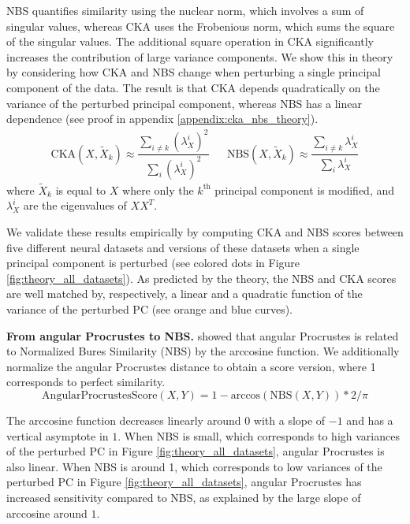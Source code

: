 \documentclass{article} %
\begin{document}
NBS quantifies similarity using the nuclear norm, which involves a sum of singular values, whereas CKA uses the Frobenious norm, which sums the square of the singular values. The additional square operation in CKA significantly increases the contribution of large variance components. We show this in theory by considering how CKA and NBS change when perturbing a single principal component of the data. The result is that CKA depends quadratically on the variance of the perturbed principal component, whereas NBS has a linear dependence (see proof in appendix \ref{appendix:cka_nbs_theory}).
\begin{align*}
\text{CKA}(X, \tilde{X}_k) \approx \dfrac{\sum_{i \ne k} (\lambda_X^i)^2}{\sum_i (\lambda_X^i)^2} && \text{NBS}(X, \tilde{X}_k) \approx \dfrac{\sum_{i \ne k} \lambda_X^i}{\sum_i \lambda_X^i}
\end{align*}
where $\tilde{X}_k$ is equal to $X$ where only the $k^{\text{th}}$ principal component is modified, and $\lambda_X^i$ are the eigenvalues of $XX^T$.

We validate these results empirically by computing CKA and NBS scores between five different neural datasets and versions of these datasets when a single principal component is perturbed (see colored dots in Figure \ref{fig:theory_all_datasets}). As predicted by the theory, the NBS and CKA scores are well matched by, respectively, a linear and a quadratic function of the variance of the perturbed PC (see orange and blue curves). 


\textbf{From angular Procrustes to NBS.} \citet{harvey2023duality} showed that angular Procrustes is related to  Normalized Bures Similarity (NBS) \citep{tang2020similarity} by the arccosine function. We additionally normalize the angular Procrustes distance to obtain a score version, where 1 corresponds to perfect similarity.
$$\text{AngularProcrustesScore}(X, Y) = 1 - \text{arccos}(\text{NBS}(X, Y)) * 2 / \pi$$

The arccosine function decreases linearly around $0$ with a slope of $-1$ and has a vertical asymptote in $1$. When NBS is small, which corresponds to high variances of the perturbed PC in Figure \ref{fig:theory_all_datasets}, angular Procrustes is also linear. When NBS is around 1, which corresponds to low variances of the perturbed PC in Figure \ref{fig:theory_all_datasets}, angular Procrustes has increased sensitivity compared to NBS, as explained by the large slope of arccosine around $1$.
\end{document}
